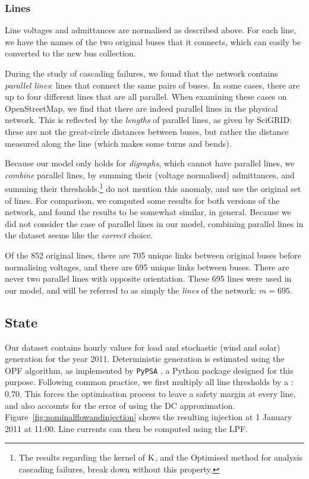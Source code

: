 \documentclass[main.tex]{subfiles}
\begin{document}
\subsubsection{Lines}
Line voltages and admittances are normalised as described above. For each line, we have the names of the two original buses that it connects, which can easily be converted to the new bus collection.

During the study of cascading failures, we found that the network contains \emph{parallel lines}: lines that connect the same pairs of buses. In some cases, there are up to four different lines that are all parallel. When examining these cases on OpenStreetMap, we find that there are indeed parallel lines in the physical network. This is reflected by the \emph{lengths} of parallel lines, as given by SciGRID: these are not the great-circle distances between buses, but rather the distance measured along the line (which makes some turns and bends).

Because our model only holds for \emph{digraphs}, which cannot have parallel lines, we \emph{combine} parallel lines, by summing their (voltage normalised) admittances, and summing their thresholds.\footnote{The results regarding the kernel of $\text{\textup{K}}$, and the Optimised method for analysis cascading failures, break down without this property.} \cite{Nesti2018emergentfailures} do not mention this anomaly, and use the original set of lines. For comparison, we computed some results for both versions of the network, and found the results to be somewhat similar, in general. Because we did not consider the case of parallel lines in our model, combining parallel lines in the dataset seems like the \emph{correct} choice.

Of the 852 original lines, there are 705 unique links between original buses before normalising voltages, and there are 695 unique links between buses. There are never two parallel lines with opposite orientation. These 695 lines were used in our model, and will be referred to as simply the \emph{lines} of the network: $m = 695$.

\subsection{State}
Our dataset contains hourly values for load and stochastic (wind and solar) generation for the year 2011. Deterministic generation is estimated using the OPF algorithm, as implemented by \texttt{PyPSA} \citep{PyPSA}, a Python package designed for this purpose. Following common practice, we first multiply all line thresholds by a : $0.70$. This forces the optimisation process to leave a safety margin at every line, and also accounts for the error of using the DC approximation. Figure~\ref{fig:nominalflowandinjection} shows the resulting injection at 1 January 2011 at 11:00. Line currents can then be computed using the LPF.
\end{document}
